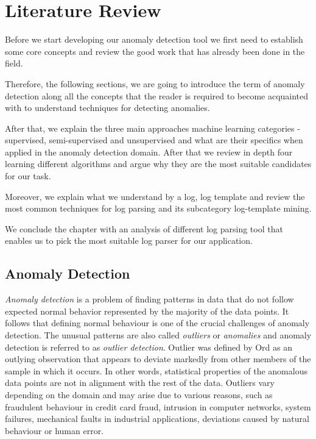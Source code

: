 \chapter{Literature Review}
\label{chapter:literatureReview}

Before we start developing our anomaly detection tool we first need to establish some core concepts and review the good work that has already been done in the field.

Therefore, the following sections, we are going to introduce the term of anomaly detection along all the concepts that the reader is required to become acquainted with to understand techniques for detecting anomalies.

After that, we explain the three main approaches machine learning categories - supervised, semi-supervised and unsupervised and what are their specifics when applied in the anomaly detection domain. 
After that we review in depth four learning different algorithms and argue why they are the most suitable candidates for our task.

Moreover, we explain what we understand by a log, log template and review the most common techniques for log parsing and its subcategory log-template mining.

We conclude the chapter with an analysis of different log parsing tool that enables us to pick the most suitable log parser for our application.

\section{Anomaly Detection}
\label{section:anomalyDetectionLiteratureReview}

\textit{Anomaly detection} is a problem of finding patterns in data that do not follow expected normal behavior represented by the majority of the data points. It follows that defining normal behaviour is one of the crucial challenges of anomaly detection. The unusual patterns are also called \textit{outliers} or \textit{anomalies} and anomaly detection is referred to as \textit{outlier detection}. Outlier was defined by Ord \cite{ORD1996175} as an outlying observation that appears to deviate markedly from other members of the sample in which it occurs. 
In other words, statistical properties of the anomalous data points are not in alignment with the rest of the data. Outliers vary depending on the domain and may arise due to various reasons, such as fraudulent behaviour in credit card fraud, intrusion in computer networks, system failures, mechanical faults in industrial applications, deviations caused by natural behaviour or human error. 

